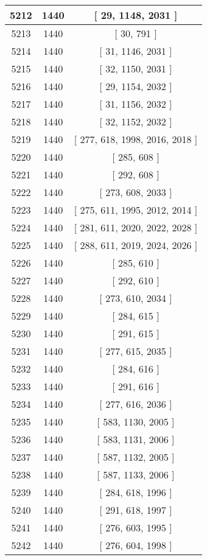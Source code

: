 \begin{center}
\begin{longtable}[H]{|| c c c ||}
\hline
5212 & 1440 & [ 29, 1148, 2031 ] \\ 
\hline
5213 & 1440 & [ 30, 791 ] \\ 
\hline
5214 & 1440 & [ 31, 1146, 2031 ] \\ 
\hline
5215 & 1440 & [ 32, 1150, 2031 ] \\ 
\hline
5216 & 1440 & [ 29, 1154, 2032 ] \\ 
\hline
5217 & 1440 & [ 31, 1156, 2032 ] \\ 
\hline
5218 & 1440 & [ 32, 1152, 2032 ] \\ 
\hline
5219 & 1440 & [ 277, 618, 1998, 2016, 2018 ] \\ 
\hline
5220 & 1440 & [ 285, 608 ] \\ 
\hline
5221 & 1440 & [ 292, 608 ] \\ 
\hline
5222 & 1440 & [ 273, 608, 2033 ] \\ 
\hline
5223 & 1440 & [ 275, 611, 1995, 2012, 2014 ] \\ 
\hline
5224 & 1440 & [ 281, 611, 2020, 2022, 2028 ] \\ 
\hline
5225 & 1440 & [ 288, 611, 2019, 2024, 2026 ] \\ 
\hline
5226 & 1440 & [ 285, 610 ] \\ 
\hline
5227 & 1440 & [ 292, 610 ] \\ 
\hline
5228 & 1440 & [ 273, 610, 2034 ] \\ 
\hline
5229 & 1440 & [ 284, 615 ] \\ 
\hline
5230 & 1440 & [ 291, 615 ] \\ 
\hline
5231 & 1440 & [ 277, 615, 2035 ] \\ 
\hline
5232 & 1440 & [ 284, 616 ] \\ 
\hline
5233 & 1440 & [ 291, 616 ] \\ 
\hline
5234 & 1440 & [ 277, 616, 2036 ] \\ 
\hline
5235 & 1440 & [ 583, 1130, 2005 ] \\ 
\hline
5236 & 1440 & [ 583, 1131, 2006 ] \\ 
\hline
5237 & 1440 & [ 587, 1132, 2005 ] \\ 
\hline
5238 & 1440 & [ 587, 1133, 2006 ] \\ 
\hline
5239 & 1440 & [ 284, 618, 1996 ] \\ 
\hline
5240 & 1440 & [ 291, 618, 1997 ] \\ 
\hline
5241 & 1440 & [ 276, 603, 1995 ] \\ 
\hline
5242 & 1440 & [ 276, 604, 1998 ] \\ 

\end{longtable}
\end{center}
